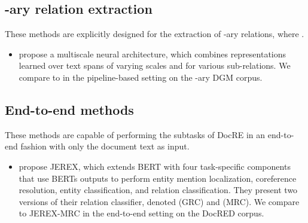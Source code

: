 \documentclass[11pt]{article}
\begin{document}
\subsection[n-ary relation extraction]{-ary relation extraction}

These methods are explicitly designed for the extraction of -ary relations, where . 

\begin{itemize}
    \item \citet{jia-etal-2019-document} propose a multiscale neural architecture, which combines representations learned over text spans of varying scales and for various sub-relations. We compare to \citet{jia-etal-2019-document} in the pipeline-based setting on the -ary DGM corpus.
\end{itemize}

\subsection{End-to-end methods}

These methods are capable of performing the subtasks of DocRE in an end-to-end fashion with only the document text as input.

\begin{itemize}
    \item \citet{eberts-ulges-2021-end} propose JEREX, which extends BERT with four task-specific components that use BERTs outputs to perform entity mention localization, coreference resolution, entity classification, and relation classification. They present two versions of their relation classifier, denoted  (GRC) and  (MRC). We compare to JEREX-MRC in the end-to-end setting on the DocRED corpus.
\end{itemize}
\end{document}
